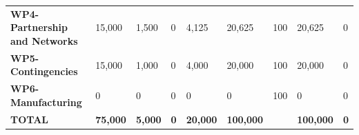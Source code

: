 \begin{table}[H]
{\begin{tabular}{p{5cm}p{2cm}p{2cm}p{2.5cm}p{2cm}p{2cm}p{2cm}p{2cm}p{2cm}}
\textbf{WP4- Partnership and Networks} & 15,000                                                                 & 1,500                                                              & 0                                                                               & 4,125                                                                        & 20,625                                                                                        & 100                          & 20,625                          & 0                                                                         \\
\textbf{WP5- Contingencies}                                                        & 15,000                                                                 & 1,000                                                              & 0                                                                               & 4,000                                                                        & 20,000                                                                                        & 100                          & 20,000                          & 0                                                                         \\
\textbf{WP6- Manufacturing}                                                        & 0                                                                      & 0                                                                  & 0                                                                               & 0                                                                            & 0                                                                                             & 100                          & 0                               & 0                                                                         \\ \hline
\textbf{TOTAL}                                                                     & \textbf{75,000}                                                        & \textbf{5,000}                                                     & \textbf{0}                                                                      & \textbf{20,000}                                                              & \textbf{100,000}                                                                              & \textbf{}                    & \textbf{100,000}                & \textbf{0}                                                               
\\ \bottomrule[2pt]
\end{tabular} }
\end{table}


